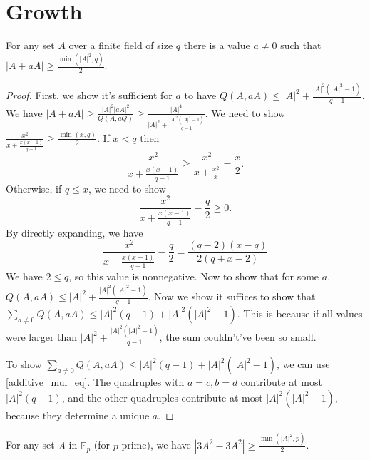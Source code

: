 \chapter{Growth}
\label{chap:growth}

\begin{theorem}
    \label{exists_grower}
    \leanok
    For any set $A$ over a finite field of size $q$ there is a value $a \neq 0$ such that
    $|A + a A| \geq \frac{\min(|A|^2, q)}2$.
\end{theorem}

\begin{proof}
    \leanok
    First, we show it's sufficient for $a$ to have $Q(A, aA) \leq |A|^2 + \frac{|A|^2 (|A|^2 - 1)}{q-1}$.
    We have $|A + a A| \geq \frac{|A|^2 |a A|^2}{Q(A, aQ)} \geq \frac{|A|^4}{|A|^2 + \frac{|A|^2 (|A|^2 - 1)}{q-1}}$.
    We need to show $\frac{x^2}{x + \frac{x(x-1)}{q-1}} \geq \frac{\min(x, q)}2$.
    If $x < q$ then
    $$\frac{x^2}{x + \frac{x (x - 1)}{q-1}} \geq \frac{x^2}{x + \frac{x^2}{x}} = \frac x2.$$
    Otherwise, if $q \leq x$, we need to show
        $$ \frac{x^2}{x + \frac{x (x - 1)}{q-1}} - \frac q2 \geq 0. $$
    By directly expanding, we have
        $$\frac{x^2}{x + \frac{x (x - 1)}{q-1}} - \frac q2 = \frac{(q-2) (x - q)}{2 (q + x - 2)}$$
    We have $2 \leq q$, so this value is nonnegative.
    Now to show that for some $a$, $Q(A, aA) \leq |A|^2 + \frac{|A|^2 (|A|^2 - 1)}{q-1}$.
    Now we show it suffices to show that $\sum_{a \neq 0} Q(A, a A) \leq |A|^2 (q-1) + |A|^2 (|A|^2 - 1)$.
    This is because if all values were larger than $|A|^2 + \frac{|A|^2 (|A|^2 - 1)}{q-1}$, the sum couldn't've been so small.

    To show $\sum_{a \neq 0} Q(A, a A) \leq |A|^2 (q-1) + |A|^2 (|A|^2 - 1)$, we can use \ref{additive_mul_eq}.
    The quadruples with $a = c, b = d$ contribute at most $|A|^2 (q-1)$, and the other quadruples contribute at most
    $|A|^2 (|A|^2 - 1)$, because they determine a unique $a$.
\end{proof}

\begin{theorem}
    \label{GUS}
    \leanok
    For any set $A$ in $\mathbb{F}_p$ (for $p$ prime), we have $|3 A^2 - 3 A^2| \geq \frac{\min(|A|^2, p)}2$.
\end{theorem}

